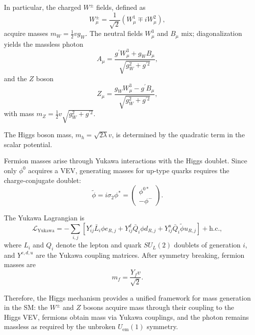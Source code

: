 In particular, the charged $W^\pm$ fields, defined as
\begin{equation}
W^\pm_\mu = \frac{1}{\sqrt{2}}(W_\mu^1 \mp iW_\mu^2),
\end{equation}
acquire masses $m_W=\frac{1}{2}vg_W$.
The neutral fields $W_\mu^3$ and $B_\mu$ mix; diagonalization yields the massless photon
\begin{equation}
A_\mu = \frac{g^\prime W_\mu^3 + g_W B_\mu}{\sqrt{g_W^2+g^{\prime 2}}},
\end{equation}
and the $Z$ boson
\begin{equation}
Z_\mu = \frac{g_W W_\mu^3 - g^\prime B_\mu}{\sqrt{g_W^2+g^{\prime 2}}},
\end{equation}
with mass $m_Z = \frac{1}{2}v\sqrt{g_W^2+g^{\prime 2}}$.

The Higgs boson mass, $m_h = \sqrt{2\lambda}v$, is determined by the quadratic term in the scalar potential.

Fermion masses arise through Yukawa interactions with the Higgs doublet. Since only $\phi^0$ acquires a VEV, generating masses for up-type quarks requires the charge-conjugate doublet:
\begin{equation}
\tilde{\phi} = i\sigma_2 \phi^* = \begin{pmatrix} \phi^{0*} \\ -\phi^- \end{pmatrix}.
\end{equation}

The Yukawa Lagrangian is
\begin{equation}
\mathcal{L}_{\text{Yukawa}} = -\sum_{i,j} \left[ Y^e_{ij} \bar{L}_i \phi e_{R,j} + Y^d_{ij} \bar{Q}_i \phi d_{R,j} + Y^u_{ij} \bar{Q}_i \tilde{\phi} u_{R,j} \right] + \text{h.c.},
\end{equation}
where $L_i$ and $Q_i$ denote the lepton and quark $SU_L(2)$ doublets of generation $i$, and $Y^{e,d,u}$ are the Yukawa coupling matrices. After symmetry breaking, fermion masses are
\begin{equation}
m_f = \frac{Y_f v}{\sqrt{2}}.
\end{equation}

Therefore, the Higgs mechanism provides a unified framework for mass generation in the SM: the $W^\pm$ and $Z$ bosons acquire mass through their coupling to the Higgs VEV, fermions obtain mass via Yukawa couplings, and the photon remains massless as required by the unbroken $U_\mathrm{em}(1)$ symmetry. 



  
